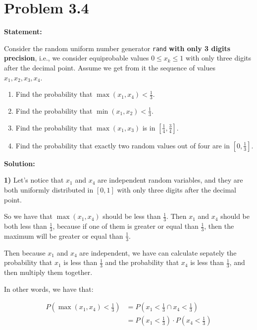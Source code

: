 \section*{Problem 3.4}

\textbf{Statement:}

Consider the random uniform number generator \texttt{rand} \textbf{with
    only 3 digits precision}, i.e., we consider equiprobable values
\( 0 \leq x_k \leq 1 \) with only three digits after the decimal
point. Assume we get from it the sequence of values \( x_1, x_2, x_3, x_4 \).

\begin{enumerate}
    \item Find the probability that \( \max(x_1, x_4) < \frac{1}{3} \).
    \item Find the probability that \( \min(x_1, x_2) < \frac{1}{3} \).
    \item Find the probability that \( \max(x_1, x_3) \) is in \( \left[ \frac{1}{4}, \frac{3}{4} \right] \).
    \item Find the probability that exactly two random values out of four are in \( \left[0, \frac{1}{3} \right] \).
\end{enumerate}

\noindent\textbf{Solution:}

\textbf{1)} Let's notice that $x_1$ and $x_4$ are independent
random variables, and they are both uniformly distributed in $[0,1]$
with only three digits after the decimal point.

So we have that $\max(x_1, x_4)$ should be less than $\frac{1}{3}$.
Then $x_1$ and $x_4$ should be both less than $\frac{1}{3}$, because
if one of them is greater or equal than $\frac{1}{3}$, then the maximum will
be greater or equal than $\frac{1}{3}$.

Then because $x_1$ and $x_4$ are independent, we have can calculate
sepately the probability that $x_1$ is less than $\frac{1}{3}$ and the
probability that $x_4$ is less than $\frac{1}{3}$, and then multiply them
together.

In other words, we have that:

\begin{equation*}
    \begin{split}
        P(\max(x_1, x_4) < \frac{1}{3}) & = P(x_1 < \frac{1}{3} \cap x_4 < \frac{1}{3})     \\
                                        & = P(x_1 < \frac{1}{3}) \cdot P(x_4 < \frac{1}{3}) \\
    \end{split}
\end{equation*}

